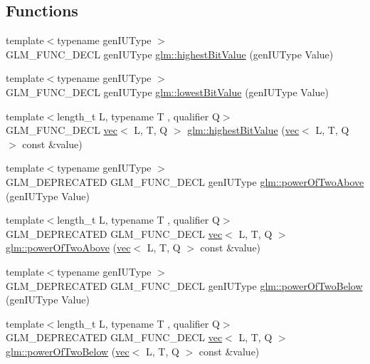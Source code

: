\subsection*{Functions}
\begin{DoxyCompactItemize}
\item 
{\footnotesize template$<$typename gen\+I\+U\+Type $>$ }\\G\+L\+M\+\_\+\+F\+U\+N\+C\+\_\+\+D\+E\+CL gen\+I\+U\+Type \hyperlink{group__gtx__bit_ga0dcc8fe7c3d3ad60dea409281efa3d05}{glm\+::highest\+Bit\+Value} (gen\+I\+U\+Type Value)
\item 
{\footnotesize template$<$typename gen\+I\+U\+Type $>$ }\\G\+L\+M\+\_\+\+F\+U\+N\+C\+\_\+\+D\+E\+CL gen\+I\+U\+Type \hyperlink{group__gtx__bit_ga2ff6568089f3a9b67f5c30918855fc6f}{glm\+::lowest\+Bit\+Value} (gen\+I\+U\+Type Value)
\item 
{\footnotesize template$<$length\+\_\+t L, typename T , qualifier Q$>$ }\\G\+L\+M\+\_\+\+F\+U\+N\+C\+\_\+\+D\+E\+CL \hyperlink{structglm_1_1vec}{vec}$<$ L, T, Q $>$ \hyperlink{group__gtx__bit_ga898ef075ccf809a1e480faab48fe96bf}{glm\+::highest\+Bit\+Value} (\hyperlink{structglm_1_1vec}{vec}$<$ L, T, Q $>$ const \&value)
\item 
{\footnotesize template$<$typename gen\+I\+U\+Type $>$ }\\G\+L\+M\+\_\+\+D\+E\+P\+R\+E\+C\+A\+T\+ED G\+L\+M\+\_\+\+F\+U\+N\+C\+\_\+\+D\+E\+CL gen\+I\+U\+Type \hyperlink{group__gtx__bit_ga8cda2459871f574a0aecbe702ac93291}{glm\+::power\+Of\+Two\+Above} (gen\+I\+U\+Type Value)
\item 
{\footnotesize template$<$length\+\_\+t L, typename T , qualifier Q$>$ }\\G\+L\+M\+\_\+\+D\+E\+P\+R\+E\+C\+A\+T\+ED G\+L\+M\+\_\+\+F\+U\+N\+C\+\_\+\+D\+E\+CL \hyperlink{structglm_1_1vec}{vec}$<$ L, T, Q $>$ \hyperlink{group__gtx__bit_ga2bbded187c5febfefc1e524ba31b3fab}{glm\+::power\+Of\+Two\+Above} (\hyperlink{structglm_1_1vec}{vec}$<$ L, T, Q $>$ const \&value)
\item 
{\footnotesize template$<$typename gen\+I\+U\+Type $>$ }\\G\+L\+M\+\_\+\+D\+E\+P\+R\+E\+C\+A\+T\+ED G\+L\+M\+\_\+\+F\+U\+N\+C\+\_\+\+D\+E\+CL gen\+I\+U\+Type \hyperlink{group__gtx__bit_ga3de7df63c589325101a2817a56f8e29d}{glm\+::power\+Of\+Two\+Below} (gen\+I\+U\+Type Value)
\item 
{\footnotesize template$<$length\+\_\+t L, typename T , qualifier Q$>$ }\\G\+L\+M\+\_\+\+D\+E\+P\+R\+E\+C\+A\+T\+ED G\+L\+M\+\_\+\+F\+U\+N\+C\+\_\+\+D\+E\+CL \hyperlink{structglm_1_1vec}{vec}$<$ L, T, Q $>$ \hyperlink{group__gtx__bit_gaf78ddcc4152c051b2a21e68fecb10980}{glm\+::power\+Of\+Two\+Below} (\hyperlink{structglm_1_1vec}{vec}$<$ L, T, Q $>$ const \&value)

\end{DoxyCompactItemize}
